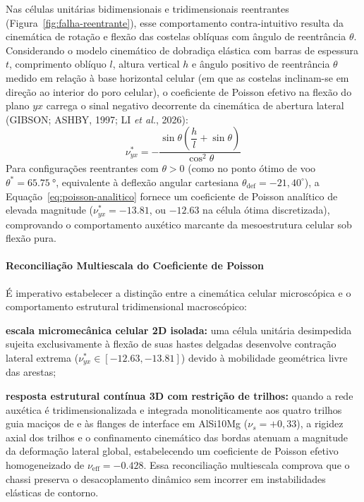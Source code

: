 Nas células unitárias bidimensionais e tridimensionais reentrantes (Figura~\ref{fig:falha-reentrante}), esse comportamento contra-intuitivo resulta da cinemática de rotação e flexão das costelas oblíquas com ângulo de reentrância $\theta$. Considerando o modelo cinemático de dobradiça elástica com barras de espessura $t$, comprimento oblíquo $l$, altura vertical $h$ e ângulo positivo de reentrância $\theta$ medido em relação à base horizontal celular (em que as costelas inclinam-se em direção ao interior do poro celular), o coeficiente de Poisson efetivo na flexão do plano $yx$ carrega o sinal negativo decorrente da cinemática de abertura lateral (GIBSON; ASHBY, 1997; LI \textit{et al.}, 2026):
\begin{equation}
  \nu_{yx}^* = -\frac{\sin\theta \left( \dfrac{h}{l} + \sin\theta \right)}{\cos^2\theta}
  \label{eq:poisson-analitico}
\end{equation}
Para configurações reentrantes com $\theta > 0$ (como no ponto ótimo de voo $\theta^* = \SI{65.75}{\degree}$, equivalente à deflexão angular cartesiana $\theta_{\text{def}} = -21{,}40^\circ$), a Equação~\eqref{eq:poisson-analitico} fornece um coeficiente de Poisson analítico de elevada magnitude ($\nu_{yx}^* = \num{-13.81}$, ou $\num{-12.63}$ na célula ótima discretizada), comprovando o comportamento auxético marcante da mesoestrutura celular sob flexão pura.

\paragraph{Reconciliação Multiescala do Coeficiente de Poisson}
É imperativo estabelecer a distinção entre a cinemática celular microscópica e o comportamento estrutural tridimensional macroscópico:
\begin{alineas}
  \item \textbf{escala micromecânica celular 2D isolada:} uma célula unitária desimpedida sujeita exclusivamente à flexão de suas hastes delgadas desenvolve contração lateral extrema ($\nu_{yx}^* \in [\num{-12.63}, \num{-13.81}]$) devido à mobilidade geométrica livre das arestas;
  \item \textbf{resposta estrutural contínua 3D com restrição de trilhos:} quando a rede auxética é tridimensionalizada e integrada monoliticamente aos quatro trilhos guia maciços de \rail{} e às flanges de interface em AlSi10Mg ($\nu_s = +0{,}33$), a rigidez axial dos trilhos e o confinamento cinemático das bordas atenuam a magnitude da deformação lateral global, estabelecendo um coeficiente de Poisson efetivo homogeneizado de $\nu_{\text{eff}} = \num{-0.428}$. Essa reconciliação multiescala comprova que o chassi preserva o desacoplamento dinâmico sem incorrer em instabilidades elásticas de contorno.
\end{alineas}

